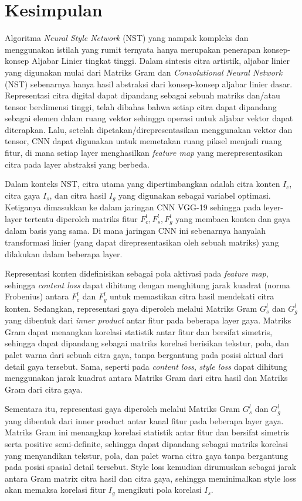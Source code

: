 \section{Kesimpulan}

Algoritma \textit{Neural Style Network} (NST) yang nampak kompleks dan menggunakan istilah yang rumit ternyata hanya merupakan penerapan konsep-konsep Aljabar Linier tingkat tinggi. Dalam sintesis citra artistik, aljabar linier yang digunakan mulai dari Matriks Gram dan \textit{Convolutional Neural Network} (NST) sebenarnya hanya hasil abstraksi dari konsep-konsep aljabar linier dasar. Representasi citra digital dapat dipandang sebagai sebuah matriks dan/atau tensor berdimensi tinggi, telah dibahas bahwa setiap citra dapat dipandang sebagai elemen dalam ruang vektor sehingga operasi untuk aljabar vektor dapat diterapkan. Lalu, setelah dipetakan/direpresentasikan menggunakan vektor dan tensor, CNN dapat digunakan untuk memetakan ruang piksel menjadi ruang fitur, di mana setiap layer menghasilkan \textit{feature map} yang merepresentasikan citra pada layer abstraksi yang berbeda.

Dalam konteks NST, citra utama yang dipertimbangkan adalah citra konten $I_c$, citra gaya $I_s$, dan citra hasil $I_g$ yang digunakan sebagai variabel optimasi. Ketiganya dimasukkan ke dalam jaringan CNN VGG-19 sehingga pada leyer-layer tertentu diperoleh matriks fitur $F_c^l, F_s^l, F_g^l$ yang membaca konten dan gaya dalam basis yang sama. Di mana jaringan CNN ini sebenarnya hanyalah transformasi linier (yang dapat direpresentasikan oleh sebuah matriks) yang dilakukan dalam beberapa layer.

Representasi konten didefinisikan sebagai pola aktivasi pada \textit{feature map}, sehingga \textit{content loss} dapat dihitung dengan menghitung jarak kuadrat (norma Frobenius) antara $F_c^l$ dan $F_g^l$ untuk memastikan citra hasil mendekati citra konten. Sedangkan, representasi gaya diperoleh melalui Matriks Gram $G_s^l$ dan $G_g^l$ yang dibentuk dari \textit{inner product} antar fitur pada beberapa layer gaya. Matriks Gram dapat menangkan korelasi statistik antar fitur dan bersifat simetris, sehingga dapat dipandang sebagai matriks korelasi berisikan tekstur, pola, dan palet warna dari sebuah citra gaya, tanpa bergantung pada posisi aktual dari detail gaya tersebut. Sama, seperti pada \textit{content loss}, \textit{style loss} dapat dihitung menggunakan jarak kuadrat antara Matriks Gram dari citra hasil dan Matriks Gram dari citra gaya.

Sementara itu, representasi gaya diperoleh melalui Matriks Gram $G_s^l$ dan $G_g^l$ yang dibentuk dari inner product antar kanal fitur pada beberapa layer gaya. Matriks Gram ini menangkap korelasi statistik antar fitur dan bersifat simetris serta positive semi-definite, sehingga dapat dipandang sebagai matriks korelasi yang menyandikan tekstur, pola, dan palet warna citra gaya tanpa bergantung pada posisi spasial detail tersebut. Style loss kemudian dirumuskan sebagai jarak antara Gram matrix citra hasil dan citra gaya, sehingga meminimalkan style loss akan memaksa korelasi fitur $I_g$ mengikuti pola korelasi $I_s$.

